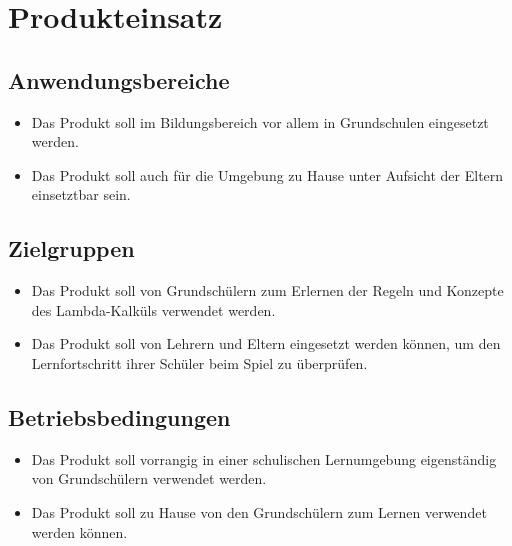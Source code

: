 \section{Produkteinsatz}

\subsection{Anwendungsbereiche}
\begin{itemize}
	\item Das Produkt soll im Bildungsbereich vor allem in Grundschulen eingesetzt werden.
	\item Das Produkt soll auch für die Umgebung zu Hause unter Aufsicht der Eltern einsetztbar sein.
\end{itemize}


\subsection{Zielgruppen}

\begin{itemize}
	\item Das Produkt soll von Grundschülern zum Erlernen der Regeln und Konzepte des Lambda-Kalküls verwendet werden.
	\item Das Produkt soll von Lehrern und Eltern eingesetzt werden können, um den Lernfortschritt ihrer Schüler beim Spiel zu überprüfen.
\end{itemize}

\subsection{Betriebsbedingungen}
\begin{itemize}
	\item Das Produkt soll vorrangig  in einer schulischen Lernumgebung eigenständig von Grundschülern verwendet werden.
	\item Das Produkt soll  zu Hause von den Grundschülern zum Lernen verwendet werden können.
\end{itemize}
